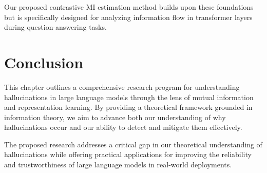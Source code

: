 Our proposed contrastive MI estimation method builds upon these foundations but is specifically designed for analyzing information flow in transformer layers during question-answering tasks.



\section{Conclusion}
\label{sec:hall_conclusion}

This chapter outlines a comprehensive research program for understanding hallucinations in large language models through the lens of mutual information and representation learning. By providing a theoretical framework grounded in information theory, we aim to advance both our understanding of why hallucinations occur and our ability to detect and mitigate them effectively.

The proposed research addresses a critical gap in our theoretical understanding of hallucinations while offering practical applications for improving the reliability and trustworthiness of large language models in real-world deployments.
